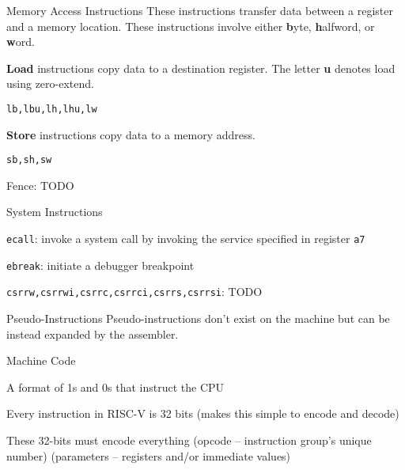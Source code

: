 \documentclass[12pt]{report}
\begin{document}
\begin{genbox}{Memory Access Instructions}
	These instructions transfer data between a register and a memory location. These instructions involve either \textbf{b}yte, \textbf{h}alfword, or \textbf{w}ord.
	
	\textbf{Load} instructions copy data to a destination register. The letter \textbf{u} denotes load using zero-extend.
	\begin{dfnitems}
		\item \verb|lb,lbu,lh,lhu,lw|
	\end{dfnitems}

	\textbf{Store} instructions copy data to a memory address.
	\begin{dfnitems}
		\item \verb|sb,sh,sw|
	\end{dfnitems}

	Fence: TODO
\end{genbox}

\begin{genbox}{System Instructions}
	\begin{dfnitems}
		\item \verb|ecall|: invoke a system call by invoking the service specified in register \verb|a7|
		\item \verb|ebreak|: initiate a debugger breakpoint
		\item \verb|csrrw,csrrwi,csrrc,csrrci,csrrs,csrrsi|: TODO
	\end{dfnitems}
\end{genbox}

\begin{genbox}{Pseudo-Instructions}
	Pseudo-instructions don't exist on the machine but can be instead expanded by the assembler.
\end{genbox}

\begin{dfnbox}{Machine Code}
	\begin{dfnitems}
		\item A format of 1s and 0s that instruct the CPU
		\item Every instruction in RISC-V is 32 bits (makes this simple to encode and decode)
		\item These 32-bits must encode everything (opcode -- instruction group's unique number) (parameters -- registers and/or immediate values)
	\end{dfnitems}
\end{dfnbox}
\end{document}
